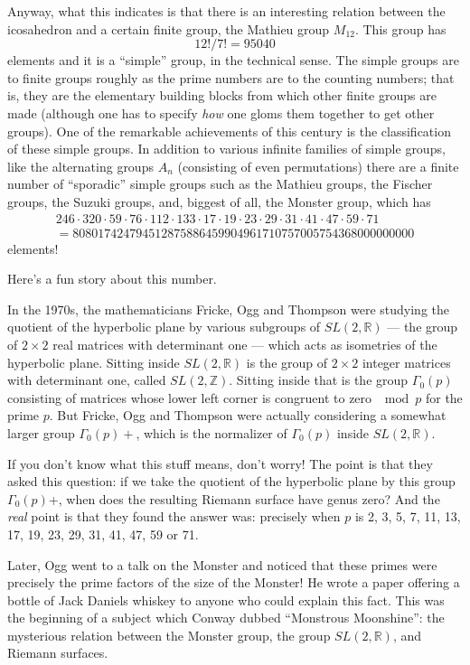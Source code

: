 \documentclass{article}
\begin{document}
Anyway, what this indicates is that there is an interesting relation
between the icosahedron and a certain finite group, the Mathieu group
\(M_{12}\). This group has \[12!/7! = 95040\] elements and it is a
``simple'' group, in the technical sense. The simple groups are to
finite groups roughly as the prime numbers are to the counting numbers;
that is, they are the elementary building blocks from which other finite
groups are made (although one has to specify \emph{how} one gloms them
together to get other groups). One of the remarkable achievements of
this century is the classification of these simple groups. In addition
to various infinite families of simple groups, like the alternating
groups \(A_n\) (consisting of even permutations) there are a finite
number of ``sporadic'' simple groups such as the Mathieu groups, the
Fischer groups, the Suzuki groups, and, biggest of all, the Monster
group, which has
\[\begin{gathered}246\cdot320\cdot59\cdot76\cdot112\cdot133\cdot17\cdot19\cdot23\cdot29\cdot31\cdot41\cdot47\cdot59\cdot71 \\= 808017424794512875886459904961710757005754368000000000\end{gathered}\]
elements!

Here's a fun story about this number.

In the 1970s, the mathematicians Fricke, Ogg and Thompson were studying
the quotient of the hyperbolic plane by various subgroups of
\(SL(2,\mathbb{R})\) --- the group of \(2\times2\) real matrices with
determinant one --- which acts as isometries of the hyperbolic plane.
Sitting inside \(SL(2,\mathbb{R})\) is the group of \(2\times2\) integer
matrices with determinant one, called \(SL(2,\mathbb{Z})\). Sitting
inside that is the group \(\Gamma_0(p)\) consisting of matrices whose
lower left corner is congruent to zero \(\mod p\) for the prime \(p\).
But Fricke, Ogg and Thompson were actually considering a somewhat larger
group \(\Gamma_0(p)+\), which is the normalizer of \(\Gamma_0(p)\)
inside \(SL(2,\mathbb{R})\).

If you don't know what this stuff means, don't worry! The point is that
they asked this question: if we take the quotient of the hyperbolic
plane by this group \(\Gamma_0(p)\)+, when does the resulting Riemann
surface have genus zero? And the \emph{real} point is that they found
the answer was: precisely when \(p\) is 2, 3, 5, 7, 11, 13, 17, 19, 23,
29, 31, 41, 47, 59 or 71.

Later, Ogg went to a talk on the Monster and noticed that these primes
were precisely the prime factors of the size of the Monster! He wrote a
paper offering a bottle of Jack Daniels whiskey to anyone who could
explain this fact. This was the beginning of a subject which Conway
dubbed ``Monstrous Moonshine'': the mysterious relation between the
Monster group, the group \(SL(2,\mathbb{R})\), and Riemann surfaces.
\end{document}
